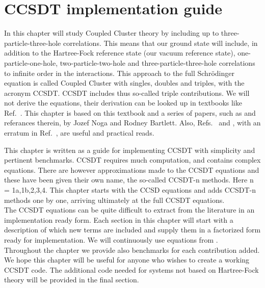 
\chapter{CCSDT implementation guide \label{ccsdt_chapter}}
In this chapter will study Coupled Cluster theory by including up to
three-particle-three-hole correlations.  This means that our ground
state will include, in addition to the Hartree-Fock reference state
(our vacuum reference state), one-particle-one-hole,
two-particle-two-hole and three-particle-three-hole correlations to
infinite order in the interactions. This approach to the full
Schr\"odinger equation is called Coupled Cluster with singles, doubles
and triples, with the acronym CCSDT.  CCSDT includes thus so-called
triple contributions. We will not derive the equations, their derivation can be looked up in textbooks like Ref.~\cite{CCSDT-ref4}. 
This chapter is based on this textbook and
a series of papers, such as \cite{CCSDT-ref3} and referances therein,
by Jozef Noga and Rodney Bartlett. Also, Refs.~\cite{CCSDT-ref5} and
\cite{CCSDT-ref1}, with an erratum in Ref.~\cite{CCSDT-ref2}, are useful and practical reads.

This chapter is written as a guide for implementing CCSDT with
simplicity and pertinent benchmarks. CCSDT requires much computation, and
contains complex equations. There are however approximations made to
the CCSDT equations and these have been given their own name, the so-called CCSDT-n
methods. Here n = 1a,1b,2,3,4. This chapter starts with the CCSD
equations and adds  CCSDT-n methods one by one, arriving ultimately at the full CCSDT equations. \\

The CCSDT equations can be quite difficult to extract from the
literature in an implementation ready form. Each section in this
chapter will start with a description of which new terms are included
and supply them in a factorized form ready for implementation. We will
continuously use equations from \cite{CCSDT-ref4}. \\

Throughout the chapter we provide also benchmarks for each
contribution added. We hope this chapter will be useful for anyone who
wishes to create a working CCSDT code. The additional code needed for
systems not based on Hartree-Fock theory  will be provided in the final
section.

